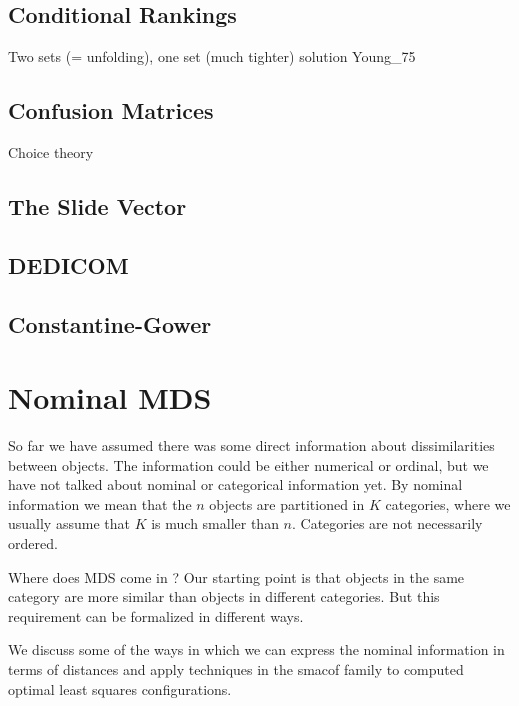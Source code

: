 \documentclass[
  12pt,
  letterpaper,
  DIV=11,
  numbers=noendperiod]{scrreprt}
\theoremstyle{remark}
\begin{document}
\section{Conditional Rankings}\label{conditional-rankings}

Two sets (= unfolding), one set (much tighter) solution Young\_75

\section{Confusion Matrices}\label{confusion-matrices}

Choice theory

\section{The Slide Vector}\label{the-slide-vector}

\section{DEDICOM}\label{dedicom}

\section{Constantine-Gower}\label{constantine-gower}


\chapter{Nominal MDS}\label{chnominal}

So far we have assumed there was some direct information about
dissimilarities between objects. The information could be either
numerical or ordinal, but we have not talked about nominal or
categorical information yet. By nominal information we mean that the
\(n\) objects are partitioned in \(K\) categories, where we usually
assume that \(K\) is much smaller than \(n\). Categories are not
necessarily ordered.

Where does MDS come in ? Our starting point is that objects in the same
category are more similar than objects in different categories. But this
requirement can be formalized in different ways.

We discuss some of the ways in which we can express the nominal
information in terms of distances and apply techniques in the smacof
family to computed optimal least squares configurations.
\end{document}
